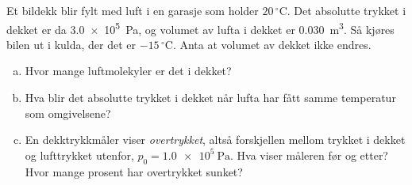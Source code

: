 %
Et bildekk blir fylt med luft i en garasje som holder $20\,^\circ$C. Det absolutte trykket i dekket er da \SI{3.0e5}{\pascal}, og volumet av lufta i dekket er \SI{0.030}{\metre\cubed}. Så kjøres bilen ut i kulda, der det er $-15\,^\circ$C. Anta at volumet av dekket ikke endres.
\begin{enumerate}[a)]
    \item Hvor mange luftmolekyler er det i dekket?
    \item Hva blir det absolutte trykket i dekket når lufta har fått samme temperatur som omgivelsene?
    \item En dekktrykkmåler viser \emph{overtrykket}, altså forskjellen mellom trykket i dekket og lufttrykket utenfor, $p_0 = \SI{1.0e5}{\pascal}$. Hva viser måleren før og etter? Hvor mange prosent har overtrykket sunket?
\end{enumerate}
%
